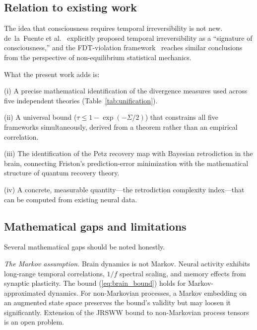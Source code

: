 \documentclass[prl,twocolumn,superscriptaddress,longbibliography,floatfix]{revtex4-2}
\newcommand{\tauasym}{\tau}
\begin{document}
\subsection{Relation to existing work}
\label{subsec:relation}

The idea that consciousness requires temporal irreversibility is not
new.  de~la~Fuente et al.~\cite{delaFuente2022} explicitly proposed
temporal irreversibility as a ``signature of consciousness,'' and
the FDT-violation framework~\cite{PRR2025} reaches similar
conclusions from the perspective of non-equilibrium statistical
mechanics.

What the present work adds is:

(i) A precise mathematical identification of the divergence measures
used across five independent theories (Table~\ref{tab:unification}).

(ii) A universal bound
($\tauasym \leq 1 - \exp(-\Sigma/2)$)
that constrains all five frameworks simultaneously, derived from a
theorem rather than an empirical correlation.

(iii) The identification of the Petz recovery map with Bayesian
retrodiction in the brain, connecting Friston's prediction-error
minimization with the mathematical structure of quantum recovery
theory.

(iv) A concrete, measurable quantity---the retrodiction complexity
index---that can be computed from existing neural data.

\subsection{Mathematical gaps and limitations}
\label{subsec:gaps}

Several mathematical gaps should be noted honestly.

\emph{The Markov assumption.}  Brain dynamics is not Markov.  Neural
activity exhibits long-range temporal correlations, $1/f$ spectral
scaling, and memory effects from synaptic plasticity.  The bound
(\ref{eq:brain_bound}) holds for Markov-approximated dynamics.  For
non-Markovian processes, a Markov embedding on an augmented state
space preserves the bound's validity but may loosen it
significantly.  Extension of the JRSWW bound to non-Markovian
process tensors~\cite{Pollock2018} is an open problem.
\end{document}
